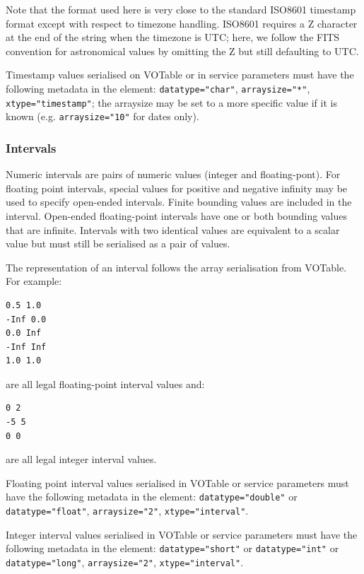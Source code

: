 \documentclass[11pt,letter]{ivoa}
\begin{document}
Note that the format used here is very close to the standard ISO8601 timestamp 
format except with respect to timezone handling. ISO8601 requires a Z character 
at the end of the string when the timezone is UTC; here, we follow the FITS 
\citep{std:FITS} convention for astronomical values by omitting the Z but still 
defaulting to UTC.

Timestamp values serialised on VOTable or in service parameters must have the following metadata in 
the  element: \verb|datatype="char"|,  \verb|arraysize="*"|,
\verb|xtype="timestamp"|; the arraysize may be set to a more specific value if it is known (e.g. 
\verb|arraysize="10"| for dates only).
 
\subsubsection{Intervals}
Numeric intervals are pairs of numeric values (integer and floating-pont). For floating point 
intervals, special values for positive and negative infinity may be used to specify open-ended intervals. 
Finite bounding values are included in the interval. Open-ended floating-point 
intervals have one or both bounding values that are infinite. Intervals with two identical values
are equivalent to a scalar value but must still be serialised as a pair of values.

The representation of an interval follows the array serialisation from VOTable. For example:

\begin{verbatim}
0.5 1.0
-Inf 0.0
0.0 Inf
-Inf Inf
1.0 1.0
\end{verbatim}


\noindent are all legal floating-point interval values and:

\begin{verbatim}
0 2
-5 5
0 0
\end{verbatim}

\noindent are all legal integer interval values. 

Floating point interval values serialised in VOTable or service parameters must have the following metadata in the 
 element: \verb|datatype="double"| or \verb|datatype="float"|, 
\verb|arraysize="2"|, \verb|xtype="interval"|.

Integer interval values serialised in VOTable or service parameters must have the following metadata in the 
 element: \verb|datatype="short"| or \verb|datatype="int"| or 
\verb|datatype="long"|, \verb|arraysize="2"|, \verb|xtype="interval"|.
\end{document}
